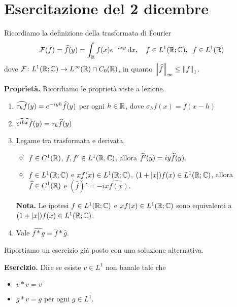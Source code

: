 \section{Esercitazione del 2 dicembre}

Ricordiamo la definizione della trasformata di Fourier
%
$$
	\mathcal{F}(f) = \widehat{f}(y) = \int_{\mathbb R} f(x) e^{-ixy} \,\mathrm{d} x, \quad f \in L^1(\mathbb R;\mathbb C), \;\; f \in L^1(\mathbb R)
$$
%
dove $\displaystyle \mathcal{F} \colon L^1(\mathbb R;\mathbb C) \to L^\infty(\mathbb R) \cap C_0(\mathbb R)$, in quanto $\left\lVert \widehat{f} \right\rVert_\infty \leq \left\lVert f \right\rVert_1$.


\textbf{Proprietà.} Ricordiamo le proprietà viste a lezione.

\begin{enumerate}
	\item $\displaystyle \widehat{\tau_h f}(y) = e^{-iyh} \widehat{f}(y)$ per ogni $h \in \mathbb R$, dove $\sigma_h f(x) = f(x - h)$


	\item $\displaystyle \widehat{e^{ihx} f}(y) = \tau_h \widehat{f}(y) $


	\item Legame tra trasformata e derivata.

	\begin{itemize}

		\item $f \in C^1(\mathbb R)$, $f,f' \in L^1(\mathbb R,\mathbb C)$, allora $\displaystyle \widehat{f'}(y) = iy \widehat{f}(y)$.


		\item $f \in L^1(\mathbb R;\mathbb C)$ e $xf(x) \in L^1(\mathbb R;\mathbb C)$, $(1 + |x|) f(x) \in L^1(\mathbb R;\mathbb C)$, allora $\displaystyle \widehat{f} \in C^1(\mathbb R)$ e $(\hat{f})' = -i \hat{xf(x)}$.

	\end{itemize}

	\textbf{Nota.} Le ipotesi $f \in L^1(\mathbb R;\mathbb C)$ e $xf(x) \in L^1(\mathbb R;\mathbb C)$ sono equivalenti a $(1 + |x|) f(x) \in L^1(\mathbb R;\mathbb C)$.


	\item  Vale $\hat{f \ast g} = \hat{f} \ast \hat{g}$.
	
\end{enumerate}

Riportiamo un esercizio già posto con una soluzione alternativa. 

\textbf{Esercizio.} Dire se esiste $v \in L^1$ non banale tale che 
\begin{itemize}

	\item $v \ast v = v$

	\item $g \ast v = g$ per ogni $g \in L^1$.

\end{itemize}

